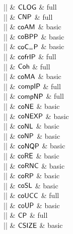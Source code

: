 |\CLOG|    & ${\mathsf{CLOG}}$ & full \\

|\CNP|    & ${\mathsf{CNP}}$ & full \\

|\coAM|    & ${\mathsf{coAM}}$ & basic \\

|\coBPP|    & ${\mathsf{coBPP}}$ & basic \\

|\coCeP|    & ${\mathsf{coC}}_{=}{\mathsf{P}}$ & basic \\

|\cofrIP|    & ${\mathsf{cofrIP}}$ & full \\

|\Coh|    & ${\mathsf{Coh}}$ & full \\

|\coMA|    & ${\mathsf{coMA}}$ & basic \\

|\compIP|    & ${\mathsf{compIP}}$ & full \\

|\compNP|    & ${\mathsf{compNP}}$ & full \\

|\coNE|    & ${\mathsf{coNE}}$ & basic \\

|\coNEXP|    & ${\mathsf{coNEXP}}$ & basic \\

|\coNL|    & ${\mathsf{coNL}}$ & basic \\

|\coNP|    & ${\mathsf{coNP}}$ & basic \\

|\coNQP|    & ${\mathsf{coNQP}}$ & basic \\

|\coRE|    & ${\mathsf{coRE}}$ & basic \\

|\coRNC|    & ${\mathsf{coRNC}}$ & basic \\

|\coRP|    & ${\mathsf{coRP}}$ & basic \\

|\coSL|    & ${\mathsf{coSL}}$ & basic \\

|\coUCC|    & ${\mathsf{coUCC}}$ & full \\

|\coUP|    & ${\mathsf{coUP}}$ & basic \\

|\CP|    & ${\mathsf{CP}}$ & full \\

|\CSIZE|    & ${\mathsf{CSIZE}}$ & basic \\


